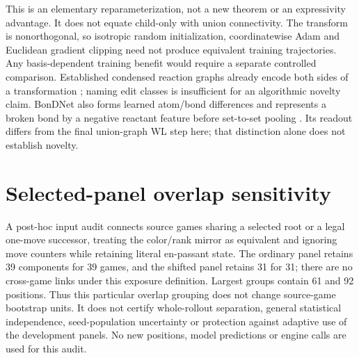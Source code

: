 This is an elementary reparameterization, not a new theorem or an expressivity
advantage. It does not equate child-only with union connectivity. The transform
is nonorthogonal, so isotropic random initialization, coordinatewise Adam and
Euclidean gradient clipping need not produce equivalent training trajectories.
Any basis-dependent training benefit would require a separate controlled
comparison. Established condensed reaction graphs already encode both sides
of a transformation \citep{heid2022}; naming edit classes is insufficient for
an algorithmic novelty claim.
BonDNet also forms learned atom/bond differences and represents a broken bond
by a negative reactant feature before set-to-set pooling \citep{wen2021}.
Its readout differs from the final union-graph WL step here; that distinction
alone does not establish novelty.

\section{Selected-panel overlap sensitivity}
A post-hoc input audit connects source games sharing a selected root or a legal
one-move successor, treating the color/rank mirror as equivalent and ignoring
move counters while retaining literal en-passant state. The ordinary panel
retains 39 components for 39 games, and the shifted panel retains 31 for 31;
there are no cross-game links under this exposure definition. Largest groups
contain 61 and 92 positions. Thus this particular overlap grouping does not
change source-game bootstrap units. It does not certify whole-rollout
separation, general statistical independence, seed-population uncertainty or
protection against adaptive use of the development panels. No new positions,
model predictions or engine calls are used for this audit.
